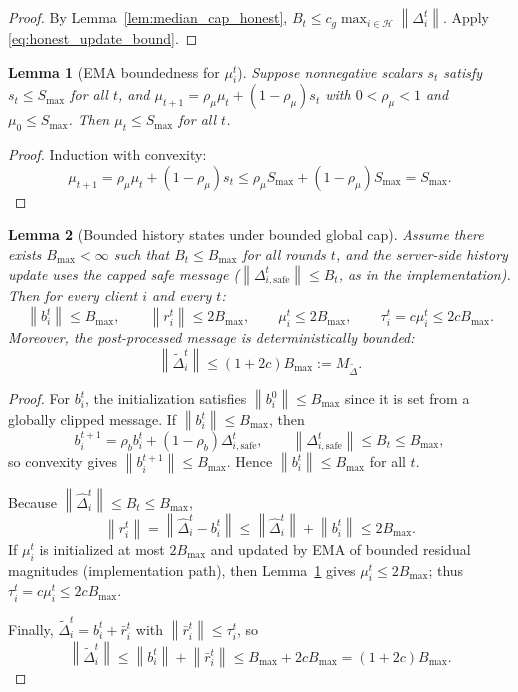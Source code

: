 \documentclass[11pt,a4paper]{article}
\newtheorem{lemma}{Lemma}
\theoremstyle{remark}
\newcommand{\HH}{\mathcal{H}}
\newcommand{\norm}[1]{\left\lVert #1 \right\rVert}
\begin{document}
\begin{proof}
By Lemma~\ref{lem:median_cap_honest},
\(
B_t\le c_g\max_{i\in\HH}\norm{\Delta_i^t}
\).
Apply \eqref{eq:honest_update_bound}.
\end{proof}

\begin{lemma}[EMA boundedness for \(\mu_i^t\)]
\label{lem:mu_ema_bounded}
Suppose nonnegative scalars \(s_t\) satisfy \(s_t\le S_{\max}\) for all \(t\),
and \(\mu_{t+1}=\rho_\mu\mu_t+(1-\rho_\mu)s_t\) with \(0<\rho_\mu<1\) and
\(\mu_0\le S_{\max}\). Then \(\mu_t\le S_{\max}\) for all \(t\).
\end{lemma}

\begin{proof}
Induction with convexity:
\[
    \mu_{t+1}
    =
    \rho_\mu\mu_t+(1-\rho_\mu)s_t
    \le
    \rho_\mu S_{\max}+(1-\rho_\mu)S_{\max}
    =
    S_{\max}.
\]
\end{proof}

\begin{lemma}[Bounded history states under bounded global cap]
\label{lem:mu_tau_bounded}
Assume there exists \(B_{\max}<\infty\) such that \(B_t\le B_{\max}\) for all
rounds \(t\), and the server-side history update uses the capped safe message
(\(\norm{\Delta_{i,\mathrm{safe}}^t}\le B_t\), as in the implementation).
Then for every client \(i\) and every \(t\):
\begin{equation}
    \norm{b_i^t}\le B_{\max},
    \qquad
    \norm{r_i^t}\le 2B_{\max},
    \qquad
    \mu_i^t\le 2B_{\max},
    \qquad
    \tau_i^t=c\mu_i^t\le 2cB_{\max}.
    \label{eq:mu_tau_bounds}
\end{equation}
Moreover, the post-processed message is deterministically bounded:
\begin{equation}
    \norm{\tilde\Delta_i^t}\le (1+2c)B_{\max} := M_{\tilde\Delta}.
    \label{eq:tilde_delta_det_bound}
\end{equation}
\end{lemma}

\begin{proof}
For \(b_i^t\), the initialization satisfies \(\norm{b_i^0}\le B_{\max}\) since
it is set from a globally clipped message. If \(\norm{b_i^t}\le B_{\max}\), then
\[
    b_i^{t+1}
    =
    \rho_b b_i^t + (1-\rho_b)\Delta_{i,\mathrm{safe}}^t,
    \qquad
    \norm{\Delta_{i,\mathrm{safe}}^t}\le B_t\le B_{\max},
\]
so convexity gives \(\norm{b_i^{t+1}}\le B_{\max}\). Hence
\(\norm{b_i^t}\le B_{\max}\) for all \(t\).

Because \(\norm{\hat\Delta_i^t}\le B_t\le B_{\max}\),
\[
    \norm{r_i^t}
    =
    \norm{\hat\Delta_i^t-b_i^t}
    \le
    \norm{\hat\Delta_i^t}+\norm{b_i^t}
    \le
    2B_{\max}.
\]
If \(\mu_i^t\) is initialized at most \(2B_{\max}\) and updated by EMA of
bounded residual magnitudes (implementation path), then
Lemma~\ref{lem:mu_ema_bounded} gives \(\mu_i^t\le 2B_{\max}\); thus
\(\tau_i^t=c\mu_i^t\le 2cB_{\max}\).

Finally, \(\tilde\Delta_i^t=b_i^t+\bar r_i^t\) with
\(\norm{\bar r_i^t}\le \tau_i^t\), so
\[
    \norm{\tilde\Delta_i^t}
    \le
    \norm{b_i^t}+\norm{\bar r_i^t}
    \le
    B_{\max}+2cB_{\max}
    =
    (1+2c)B_{\max}.
\]
\end{proof}
\end{document}
